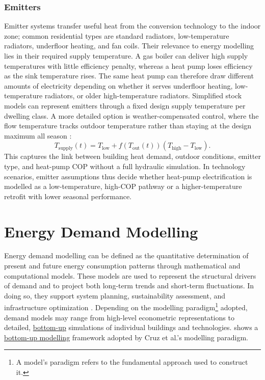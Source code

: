 \subsubsection*{Emitters}
Emitter systems transfer useful heat from the conversion technology to the indoor zone; common residential types are standard radiators, low-temperature radiators, underfloor heating, and fan coils. Their relevance to energy modelling lies in their required supply temperature. A gas boiler can deliver high supply temperatures with little efficiency penalty, whereas a heat pump loses efficiency as the sink temperature rises. The same heat pump can therefore draw different amounts of electricity depending on whether it serves underfloor heating, low-temperature radiators, or older high-temperature radiators.
\newline Simplified stock models can represent emitters through a fixed design supply temperature per dwelling class. A more detailed option is weather-compensated control, where the flow temperature tracks outdoor temperature rather than staying at the design maximum all season \cite{home_energy_model_heat_pumps_2026}:
\begin{equation}
    T_\text{supply}(t)
    =
    T_\text{low}
    +
    f(T_\text{out}(t))
    \left(
    T_\text{high} - T_\text{low}
    \right).
\end{equation}
This captures the link between building heat demand, outdoor conditions, emitter type, and heat-pump COP without a full hydraulic simulation. In technology scenarios, emitter assumptions thus decide whether heat-pump electrification is modelled as a low-temperature, high-COP pathway or a higher-temperature retrofit with lower seasonal performance.


\pagebreak
\section{Energy Demand Modelling}

Energy demand modelling can be defined as the quantitative determination of present and future energy consumption patterns through mathematical and computational models. These models are used to represent the structural drivers of demand and to project both long-term trends and short-term fluctuations. In doing so, they support system planning, sustainability assessment, and infrastructure optimization \cite{verwiebe_modeling_2021}. Depending on the modelling paradigm\footnote{A model's paradigm refers to the fundamental approach used to construct it.} adopted, demand models may range from high-level econometric representations to detailed, \hyperref[sec:bottom_up]{bottom-up} simulations of individual buildings and technologies. 
\newline {} shows a \hyperref[sec:bottomUpModelling]{bottom-up modelling} framework adopted by Cruz et al.'s modelling paradigm.


